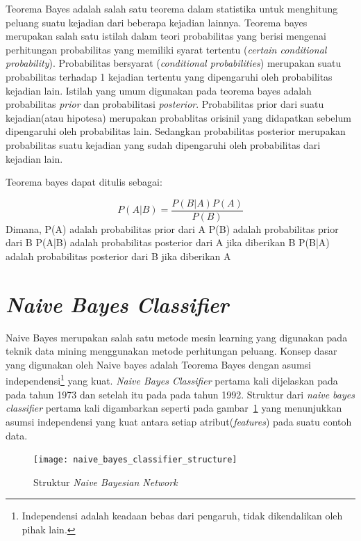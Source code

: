 	Teorema Bayes adalah salah satu teorema dalam statistika untuk menghitung peluang suatu kejadian dari beberapa kejadian lainnya. Teorema bayes merupakan salah satu istilah dalam teori probabilitas yang berisi mengenai perhitungan probabilitas yang memiliki syarat tertentu (\textit{certain conditional probability}). Probabilitas bersyarat (\textit{conditional probabilities}) merupakan suatu probabilitas terhadap 1 kejadian tertentu yang dipengaruhi oleh probabilitas kejadian lain. Istilah yang umum digunakan pada teorema bayes adalah probabilitas \textit{prior} dan probabilitasi \textit{posterior}. Probabilitas prior dari suatu kejadian(atau hipotesa) merupakan probablitas orisinil yang didapatkan sebelum dipengaruhi oleh probabilitas lain. Sedangkan probabilitas posterior merupakan probabilitas suatu kejadian yang sudah dipengaruhi oleh probabilitas dari kejadian lain.
	
	Teorema bayes dapat ditulis sebagai:
	
\begin{equation} \label{eq:1}
P(A|B) = \dfrac{P(B|A)P(A)}{P(B)}
\end{equation}
Dimana,
P(A) adalah probabilitas prior dari A
P(B) adalah probabilitas prior dari B
P(A|B) adalah probabilitas posterior dari A jika diberikan B
P(B|A) adalah probabilitas posterior dari B jika diberikan A

\section{\textit{Naive Bayes Classifier}}
	
	 Naive Bayes merupakan salah satu metode mesin learning yang digunakan pada teknik data mining menggunakan metode perhitungan peluang. Konsep dasar yang digunakan oleh Naive bayes adalah Teorema Bayes dengan asumsi independensi\footnote{Independensi adalah keadaan bebas dari pengaruh, tidak dikendalikan oleh pihak lain.} yang kuat. \textit{Naive Bayes Classifier} pertama kali dijelaskan pada \cite{ro1973pattern} pada tahun 1973 dan setelah itu pada \cite{langley1992analysis} pada tahun 1992. Struktur dari \textit{naive bayes classifier} pertama kali digambarkan seperti pada gambar~\ref{fig:Struktur Naive Bayesian Network} yang menunjukkan asumsi independensi yang kuat antara setiap atribut(\textit{features}) pada suatu contoh data.
	 
\begin{figure}[H]
\centering
\texttt{[image: naive\_bayes\_classifier\_structure]}
\caption[Struktur \textit{Naive Bayesian Network}]{Struktur \textit{Naive Bayesian Network}}
\label{fig:Struktur Naive Bayesian Network}
\end{figure}

